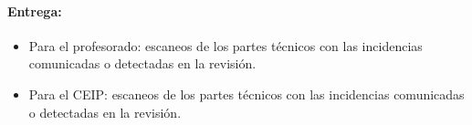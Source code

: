 \documentclass[
  spanish,
  11pt,
  paper=a4,
  ,captions=tableheading
]{scrartcl}
\providecommand{\tightlist}{%
  \setlength{\itemsep}{0pt}\setlength{\parskip}{0pt}}
\begin{document}
\paragraph{Entrega:}\label{entrega-1}

\begin{itemize}
\tightlist
\item
  Para el profesorado: escaneos de los partes técnicos con las
  incidencias comunicadas o detectadas en la revisión.
\item
  Para el CEIP: escaneos de los partes técnicos con las incidencias
  comunicadas o detectadas en la revisión.
\end{itemize}
\end{document}
